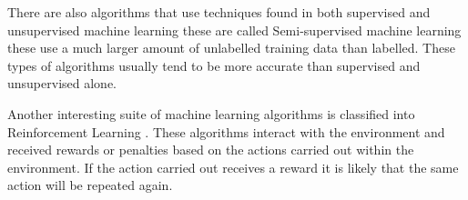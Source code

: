 There are also algorithms that use techniques found in both supervised and unsupervised machine learning these are called Semi-supervised \cite{machineLearning0} machine learning these use a much larger amount of unlabelled training data than labelled. These types of algorithms usually tend to be more accurate than supervised and unsupervised alone.

Another interesting suite of machine learning algorithms is classified into Reinforcement Learning \cite{reinforcementLearning}. These algorithms interact with the environment and received rewards or penalties based on the actions carried out within the environment. If the action carried out receives a reward it is likely that the same action will be repeated again. 

%
%
%
%

